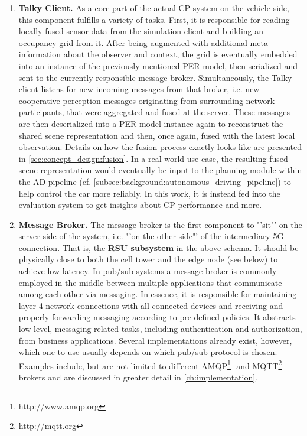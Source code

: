 \begin{enumerate}[C1: ]
	\item \textbf{Talky Client.} As a core part of the actual CP system on the vehicle side, this component fulfills a variety of tasks. First, it is responsible for reading locally fused sensor data from the simulation client and building an occupancy grid from it. After being augmented with additional meta information about the observer and context, the grid is eventually embedded into an instance of the previously mentioned PER model, then serialized and sent to the currently responsible message broker. Simultaneously, the Talky client listens for new incoming messages from that broker, i.e. new cooperative perception messages originating from surrounding network participants, that were aggregated and fused at the server. These messages are then deserialized into a PER model instance again to reconstruct the shared scene representation and then, once again, fused with the latest local observation. Details on how the fusion process exactly looks like are presented in \autoref{sec:concept_design:fusion}. In a real-world use case, the resulting fused scene representation would eventually be input to the planning module within the AD pipeline (cf. \autoref{subsec:background:autonomous_driving_pipeline}) to help control the car more reliably. In this work, it is instead fed into the evaluation system to get insights about CP performance and more.
	\item \textbf{Message Broker.} The message broker is the first component to "'sit"' on the server-side of the system, i.e. "'on the other side"' of the intermediary 5G connection. That is, the \textbf{RSU subsystem} in the above schema. It should be physically close to both the cell tower and the edge node (see below) to achieve low latency. In pub/sub systems a message broker is commonly employed in the middle between multiple applications that communicate among each other via messaging. In essence, it is responsible for maintaining layer 4 network connections with all connected devices and receiving and properly forwarding messaging according to pre-defined policies. It abstracts low-level, messaging-related tasks, including authentication and authorization, from business applications. Several implementations already exist, however, which one to use usually depends on which pub/sub protocol is chosen. Examples include, but are not limited to different AMQP\footnote{http://www.amqp.org}- and MQTT\footnote{http://mqtt.org} brokers and are discussed in greater detail in \autoref{ch:implementation}.

\end{enumerate}
